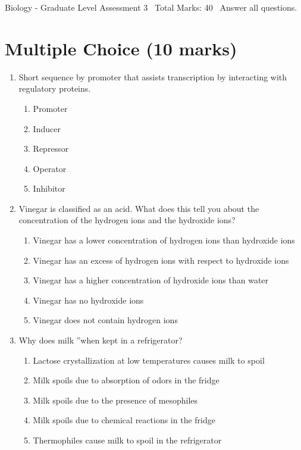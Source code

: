 \documentclass[12pt]{article}
\begin{document}
\begin{center}
Biology - Graduate Level Assessment 3 \
Total Marks: 40 \
Answer all questions.
\end{center}

\section*{Multiple Choice (10 marks)}
\begin{enumerate}[label=\arabic*.]
\item Short sequence by promoter that assists transcription by interacting with regulatory
proteins.
\begin{enumerate}[label=(\alph*)]
    \item Promoter
    \item Inducer
    \item Repressor
    \item Operator
    \item Inhibitor
\end{enumerate}
\item Vinegar is classified as an acid. What does this tell you about the concentration of the
hydrogen ions and the hydroxide ions?
\begin{enumerate}[label=(\alph*)]
    \item Vinegar has a lower concentration of hydrogen ions than hydroxide ions
    \item Vinegar has an excess of hydrogen ions with respect to hydroxide ions
    \item Vinegar has a higher concentration of hydroxide ions than water
    \item Vinegar has no hydroxide ions
    \item Vinegar does not contain hydrogen ions
\end{enumerate}
\item Why does milk \textquotedblleftspoil\textquotedblright when kept in a refrigerator?
\begin{enumerate}[label=(\alph*)]
    \item Lactose crystallization at low temperatures causes milk to spoil
    \item Milk spoils due to absorption of odors in the fridge
    \item Milk spoils due to the presence of mesophiles
    \item Milk spoils due to chemical reactions in the fridge
    \item Thermophiles cause milk to spoil in the refrigerator

\end{enumerate}
\end{enumerate}
\end{document}
